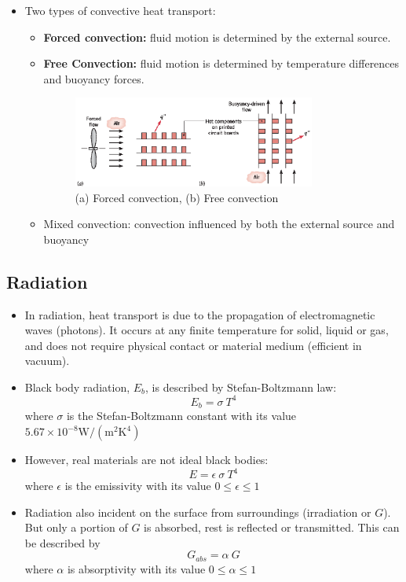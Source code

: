 \documentclass[12pt, a4paper]{article}
\begin{document}
\begin{itemize}
    \item Two types of convective heat transport:
    \begin{itemize}
        \item \textbf{Forced convection:} fluid motion is determined by the external source.
        \item \textbf{Free Convection:} fluid motion is determined by temperature differences and buoyancy forces.
    \begin{figure}[H]
        \centering
        \includegraphics[width = 0.8\textwidth]{img/forced_and_free_convection.eps}
        \caption{(a) Forced convection, (b) Free convection}
    \end{figure}

    \item Mixed convection: convection influenced by both the external source and buoyancy
    \end{itemize}
\end{itemize}
 
\subsection{Radiation}
\begin{itemize}
    \item In radiation, heat transport is due to the propagation of electromagnetic waves (photons). It occurs at any finite temperature for solid, liquid or gas, and does not require physical contact or material medium (efficient in vacuum).
    
    \item Black body radiation, $E_{b}$, is described by Stefan-Boltzmann law: 
    \[ E_{b} = \sigma \ T^{4} \] 
    where $\sigma$ is the Stefan-Boltzmann constant with its value $ 5.67\times10^{-8} \mathrm{W/(m^{2} K^{4})}$

    \item However, real materials are not ideal black bodies:  \[ E = \epsilon \ \sigma \ T^{4} \] where $\epsilon$ is the emissivity with its value $0 \leq \epsilon \leq 1$

    \item Radiation also incident on the surface from surroundings (irradiation or $G$). But only a portion of $G$ is absorbed, rest is reflected or transmitted. This can be described by \[ G_{abs} = \alpha  \ G \] where $\alpha$ is absorptivity with its value $0 \leq \alpha \leq 1$
\end{itemize}
\newpage
\end{document}
